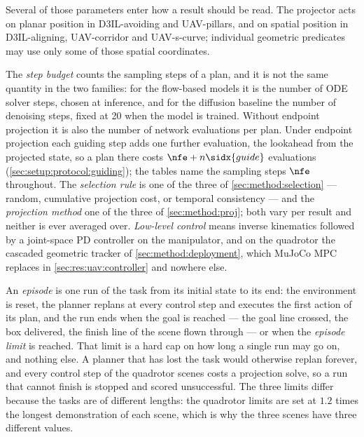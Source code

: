 Several of those parameters enter how a result should be read. The projector acts on planar position in
D3IL-avoiding and UAV-pillars, and on spatial position in D3IL-aligning, UAV-corridor and UAV-s-curve;
individual geometric predicates may use only some of those spatial coordinates.

The \emph{step budget} counts the sampling steps of a plan, and it is not the same quantity in the two
families: for the flow-based models it is the number of ODE solver steps, chosen at inference, and for
the diffusion baseline the number of denoising steps, fixed at 20 when the model is trained. Without
endpoint projection it is also the number of network evaluations per plan. Under endpoint projection each
guiding step adds one further evaluation, the lookahead from the projected state, so a plan there costs
$\nfe + n\sidx{guide}$ evaluations (\autoref{sec:setup:protocol:guiding}); the tables name the sampling
steps $\nfe$ throughout.
The \emph{selection rule} is one of the three of \autoref{sec:method:selection} --- random, cumulative
projection cost, or temporal consistency --- and the \emph{projection method} one of the three of
\autoref{sec:method:proj}; both vary per result and neither is ever averaged over. \emph{Low-level
control} means inverse kinematics followed by a joint-space PD controller on the manipulator, and on the
quadrotor the cascaded geometric tracker of \autoref{sec:method:deployment}, which MuJoCo MPC replaces in
\autoref{sec:res:uav:controller} and nowhere else.

An \emph{episode} is one run of the task from its initial state to its end: the environment is reset, the
planner replans at every control step and executes the first action of its plan, and the run ends when the
goal is reached --- the goal line crossed, the box delivered, the finish line of the scene flown through
--- or when the \emph{episode limit} is reached. That limit is a hard cap on how long a single run may
go on, and nothing else. A planner that has lost the task would otherwise replan forever, and every control step of the
quadrotor scenes costs a projection solve, so a run that cannot finish is stopped and scored unsuccessful.
The three limits differ because the tasks are of different lengths: the quadrotor limits are set at $1.2$
times the longest demonstration of each scene, which is why the three scenes have three different values.

